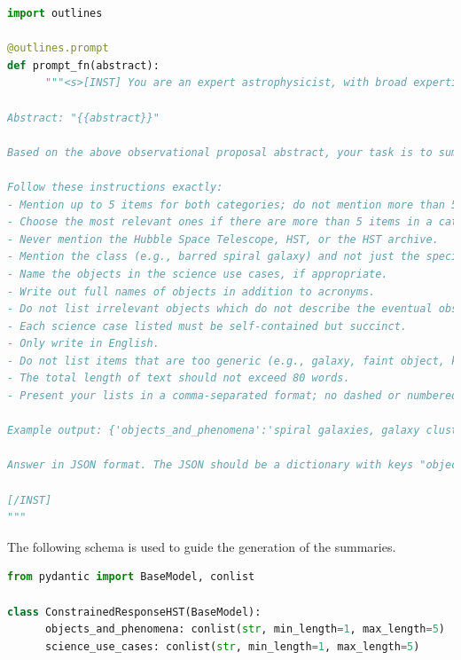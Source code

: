 \documentclass[10pt]{article} %
\begin{document}
\begin{lstlisting}[language=Python]
import outlines 

@outlines.prompt
def prompt_fn(abstract):
      """<s>[INST] You are an expert astrophysicist, with broad expertise across observational and theoretical astrophysics. You are able to extract core information from astrophysical texts.

Abstract: "{{abstract}}"

Based on the above observational proposal abstract, your task is to summarize the nature of the eventual observations. You will identify the astrophysical objects and phenomena, as well as the potential science use cases described in the abstract.

Follow these instructions exactly:
- Mention up to 5 items for both categories; do not mention more than 5 items in either category. 
- Choose the most relevant ones if there are more than 5 items in a category.
- Never mention the Hubble Space Telescope, HST, or the HST archive.
- Mention the class (e.g., barred spiral galaxy) and not just the specific instance (e.g., Andromeda).
- Name the objects in the science use cases, if appropriate.
- Write out full names of objects in addition to acronyms.
- Do not list irrelevant objects which do not describe the eventual observation, such as units or proposal Cycle numbers. List fewer but more relevant objects, if in doubt.
- Each science case listed must be self-contained but succinct.
- Only write in English.
- Do not list items that are too generic (e.g., galaxy, faint object, kinematics)
- The total length of text should not exceed 80 words.
- Present your lists in a comma-separated format; no dashed or numbered lists.

Example output: {'objects_and_phenomena':'spiral galaxies, galaxy clusters, supernova remnants', 'science_use_cases':'model galactic structure and evolution, characterize dark matter distribution in clusters, analyze expansion rates of supernova remnants'}

Answer in JSON format. The JSON should be a dictionary with keys "objects_and_phenomena" and "science_use_cases".

[/INST]
"""
\end{lstlisting}

The following schema is used to guide the generation of the summaries.

\begin{lstlisting}[language=Python]
from pydantic import BaseModel, conlist

class ConstrainedResponseHST(BaseModel):
      objects_and_phenomena: conlist(str, min_length=1, max_length=5)
      science_use_cases: conlist(str, min_length=1, max_length=5)
\end{lstlisting}
\end{document}
